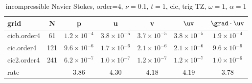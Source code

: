 \begin{table}[hbt]
\begin{center}
\begin{tabular}{|l|c|c|c|c|c|c|} \hline\hline 
grid         & N   &  p                   &  u & v & $\uv$ & $\grad\cdot\uv$\\ \hline 
 cicb.order4 & 61 &  $1.2\times10^{ -4}$  &  $3.8\times10^{ -5}$  &  $3.7\times10^{ -5}$  &  $3.8\times10^{ -5}$  &  $1.9\times10^{ -4}$   \\ \hline
 cic.order4 & 121 &  $9.6\times10^{ -6}$  &  $1.7\times10^{ -6}$  &  $2.1\times10^{ -6}$  &  $2.1\times10^{ -6}$  &  $9.6\times10^{ -6}$   \\ \hline
cic2.order4 & 241 &  $6.2\times10^{ -7}$  &  $1.0\times10^{ -7}$  &  $1.2\times10^{ -7}$  &  $1.2\times10^{ -7}$  &  $1.0\times10^{ -6}$   \\ \hline
    rate    &     &     $3.86$ &       $4.30$ &       $4.18$ &       $4.19$ &       $3.78$  \\ \hline\hline
\end{tabular}
\caption{incompressible Navier Stokes, order=$4$, $\nu=0.1$, $t=1$, cic, trig TZ, $\omega=1$, $\alpha=1$}\label{table:ins.cic}
\end{center}
\end{table}

